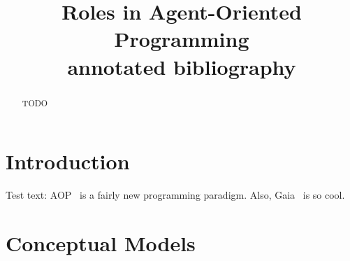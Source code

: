 \documentclass{article}
\title{Roles in Agent-Oriented Programming\\\small{annotated bibliography}}
\begin{document}
\maketitle

\begin{abstract}
TODO
\end{abstract}

\section{Introduction}

Test text:
AOP~\cite{journals/ai/Shoham93} is a fairly new programming paradigm.
Also, Gaia~\cite{journals/aamas/WooldridgeJK00} is so cool.

\section{Conceptual Models}



\end{document}
